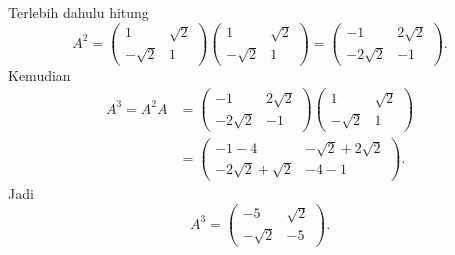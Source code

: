 \documentclass[11pt,a4paper]{article}
\begin{document}
\begin{enumerate}
\begin{enumerate}
Terlebih dahulu hitung
\[
    A^2=
    \begin{pmatrix}1&\sqrt{2}\\-\sqrt{2}&1\end{pmatrix}
    \begin{pmatrix}1&\sqrt{2}\\-\sqrt{2}&1\end{pmatrix}
    =\begin{pmatrix}
        -1&2\sqrt{2}\\
        -2\sqrt{2}&-1
    \end{pmatrix}.
\]
Kemudian
\begin{align*}
    A^3=A^2A
    &=\begin{pmatrix}-1&2\sqrt{2}\\-2\sqrt{2}&-1\end{pmatrix}
      \begin{pmatrix}1&\sqrt{2}\\-\sqrt{2}&1\end{pmatrix}\\
    &=\begin{pmatrix}
        -1-4&-\sqrt{2}+2\sqrt{2}\\
        -2\sqrt{2}+\sqrt{2}&-4-1
    \end{pmatrix}.
\end{align*}
Jadi
\[
    \boxed{A^3=\begin{pmatrix}
        -5&\sqrt{2}\\
        -\sqrt{2}&-5
    \end{pmatrix}}.
\]
\end{enumerate}
\end{enumerate}
\end{document}
